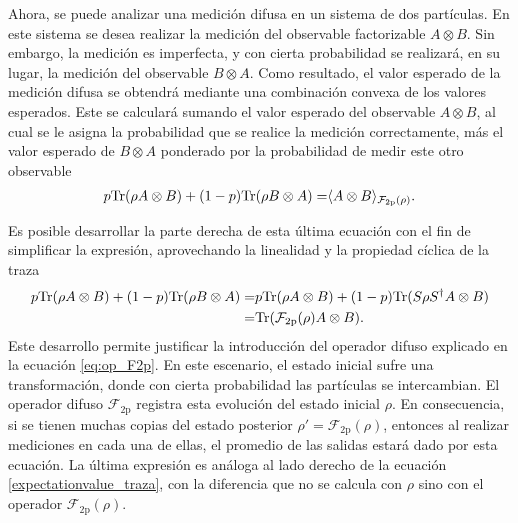 Ahora, se puede analizar una medición difusa en un sistema
de dos partículas. En este sistema se desea realizar la medición del observable factorizable $A\otimes B$. Sin embargo, la medición es imperfecta, y con cierta probabilidad se realizará, en su lugar, la medición del observable $B\otimes A$. Como resultado, el valor esperado de la medición difusa se obtendrá mediante una combinación convexa de los valores esperados. Este se calculará sumando el valor esperado del observable $A\otimes B$, al cual se le asigna la probabilidad que se realice la medición correctamente, más el valor esperado de $B\otimes A$ ponderado por la probabilidad de medir este otro observable {\cite{Pineda_2021}}\begin{equation}\label{eq:Expected-Value-FM-2p}
    \begin{split}
         p{\rm Tr}(\rho A\otimes B)+(1-p){\rm Tr}(\rho B\otimes A)=&\langle {A\otimes B}\rangle_{\mathcal{F}_{2\text{p}}(\rho)}.\\
    \end{split}
\end{equation}

%
Es posible desarrollar la parte derecha de esta última ecuación con el fin de simplificar la expresión, aprovechando la linealidad y la propiedad cíclica de la traza \begin{equation}\label{eq:Expected-Value-FM-2p-desarrollo}
    \begin{split}
         p{\rm Tr}(\rho A\otimes B)+(1-p){\rm Tr}(\rho B\otimes A)
        =&p{\rm Tr}(\rho A\otimes B)+(1-p){\rm Tr}(S\rho S^\dagger A\otimes B)\\
        =&{\rm Tr}(\mathcal{F}_{2\text{p}}(\rho)A\otimes B).\\
    \end{split}
\end{equation} Este desarrollo permite justificar la introducción del operador difuso explicado en la ecuación {\eqref{eq:op_F2p}}. En este escenario, el estado inicial sufre una transformación, donde  con cierta probabilidad las partículas se intercambian. El operador difuso $\mathcal{F}_{2\text{p}}$ registra esta evolución del estado inicial $\rho$. En consecuencia, si se tienen muchas copias del estado posterior $\rho'=\mathcal{F}_{2\text{p}}(\rho)$, entonces al realizar mediciones en cada una de ellas, el promedio de las salidas estará dado por esta ecuación.  La última expresión es análoga al lado derecho de la ecuación {\eqref{expectationvalue_traza}}, con la diferencia que no se calcula con $\rho$ sino con el operador $\mathcal{F}_{2\text{p}}(\rho)$.



